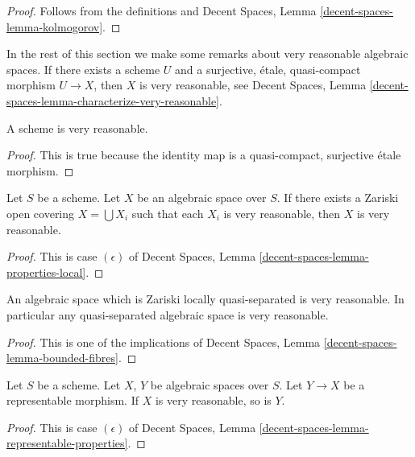 \begin{proof}
Follows from the definitions and
Decent Spaces, Lemma \ref{decent-spaces-lemma-kolmogorov}.
\end{proof}

\noindent
In the rest of this section we make some remarks about very reasonable
algebraic spaces. If there exists a scheme $U$ and a
surjective, \'etale, quasi-compact
morphism $U \to X$, then $X$ is very reasonable, see
Decent Spaces, Lemma \ref{decent-spaces-lemma-characterize-very-reasonable}.

\begin{lemma}
\label{lemma-scheme-very-reasonable}
A scheme is very reasonable.
\end{lemma}

\begin{proof}
This is true because the identity map is a quasi-compact, surjective
\'etale morphism.
\end{proof}

\begin{lemma}
\label{lemma-very-reasonable-Zariski-local}
Let $S$ be a scheme.
Let $X$ be an algebraic space over $S$.
If there exists a Zariski open covering $X = \bigcup X_i$ such that
each $X_i$ is very reasonable, then $X$ is very reasonable.
\end{lemma}

\begin{proof}
This is case $(\epsilon)$ of
Decent Spaces, Lemma \ref{decent-spaces-lemma-properties-local}.
\end{proof}

\begin{lemma}
\label{lemma-quasi-separated-very-reasonable}
An algebraic space which is Zariski locally quasi-separated is very reasonable.
In particular any quasi-separated algebraic space is very reasonable.
\end{lemma}

\begin{proof}
This is one of the implications of
Decent Spaces, Lemma \ref{decent-spaces-lemma-bounded-fibres}.
\end{proof}

\begin{lemma}
\label{lemma-representable-very-reasonable}
Let $S$ be a scheme.
Let $X$, $Y$ be algebraic spaces over $S$.
Let $Y \to X$ be a representable morphism.
If $X$ is very reasonable, so is $Y$.
\end{lemma}

\begin{proof}
This is case $(\epsilon)$ of
Decent Spaces, Lemma \ref{decent-spaces-lemma-representable-properties}.
\end{proof}

